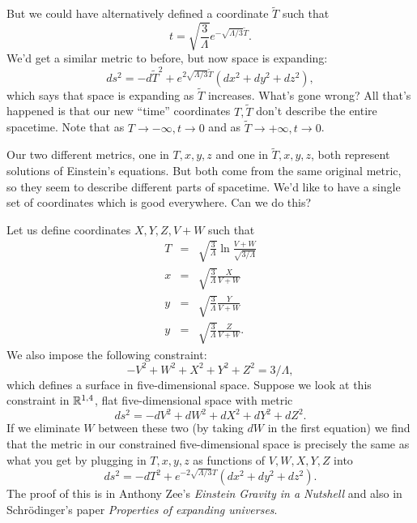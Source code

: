 But we could have alternatively defined a coordinate $\tilde T$ such that
$$t=\sqrt{\frac{3}{\Lambda}}e^{-\sqrt{\Lambda/3}\tilde T}.$$
We'd get a similar metric to before, but now space is expanding:
$$ds^2 = -d\tilde T^2 +e^{2\sqrt{\Lambda/3}\tilde T} (dx^2+dy^2 + dz^2),$$
which says that space is expanding as $\tilde T$ increases. What's gone wrong? All that's happened is that our new ``time'' coordinates $T,\tilde T$ don't describe the entire spacetime. Note that as $T\to -\infty, t\to 0$ and as $\tilde T \to +\infty, t\to 0$.

Our two different metrics, one in $T,x,y,z$ and one in $\tilde T,x,y,z$, both represent solutions of Einstein's equations. But both come from the same original metric, so they seem to describe different parts of spacetime. We'd like to have a single set of coordinates which is good everywhere. Can we do this?

Let us define coordinates $X,Y,Z,V+W$ such that
\begin{eqnarray*}
T&=&\sqrt{\frac{3}{\Lambda}}\ln \frac{V+W}{\sqrt{3/\Lambda}}\\
x&=& \sqrt{\frac{3}{\Lambda}} \frac{X}{V+W}\\
y&=& \sqrt{\frac{3}{\Lambda}} \frac{Y}{V+W}\\
y&=& \sqrt{\frac{3}{\Lambda}} \frac{Z}{V+W}.
\end{eqnarray*}
We also impose the following constraint:
$$-V^2+W^2+X^2+Y^2 +Z^2=3/\Lambda,$$
which defines a surface in five-dimensional space. Suppose we look at this constraint in $\mathbb{R}^{1,4}$, flat five-dimensional space with metric
$$ds^2=-dV^2+dW^2+dX^2+dY^2+dZ^2.$$
If we eliminate $W$ between these two (by taking $dW$ in the first equation) we find that the metric in our constrained five-dimensional space is precisely the same as what you get by plugging in
$T,x,y,z$ as functions of $V,W,X,Y,Z$ into
$$ds^2=-dT^2+e^{-2\sqrt{\Lambda/3}T}(dx^2+dy^2+dz^2).$$
The proof of this is in Anthony Zee's \textit{Einstein Gravity in a Nutshell} and also in Schr\"odinger's paper \textit{Properties of expanding universes}.